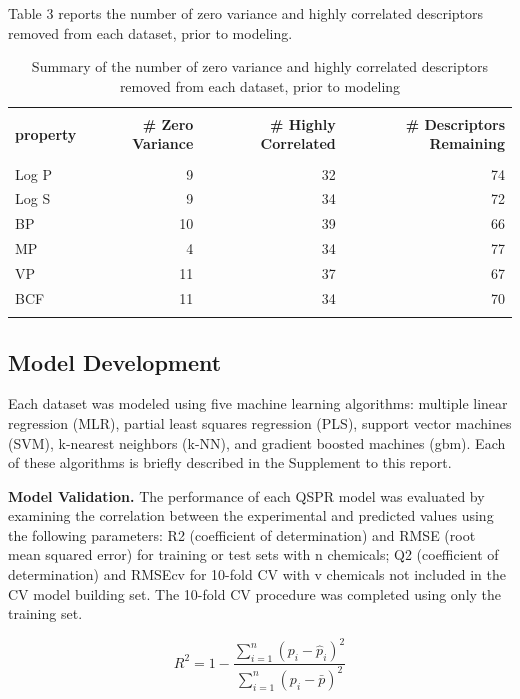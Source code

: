 \documentclass[10pt, letter]{article}
\renewcommand{\=}{\, =\, }
\newcommand{\+}{\, +\, }
\renewcommand{\-}{\, -\, }
\begin{document}
Table 3 reports the number of zero variance and highly correlated descriptors removed from each dataset, prior to modeling.

\begin{table}[H]
\begin{center}
\begin{tabular}{lrrr}
\toprule
&&\\
{\bf property} & {\bf  \# Zero Variance} & {\bf \# Highly Correlated} & {\bf \# Descriptors Remaining}\\
\midrule
&&\\
Log P  &  9 & 32 & 74\\
Log S  &  9 & 34 & 72\\
BP  &  10 & 39 & 66\\
MP  & 4 & 34 & 77\\
VP  & 11 & 37 & 67\\
BCF  & 11 & 34 & 70\\
&&\\
\bottomrule
\end{tabular}
\end{center}
\caption{Summary of the number of zero variance and highly correlated descriptors removed from each dataset, prior to modeling}
\end{table}

\subsection{Model Development}

Each dataset was modeled using five machine learning algorithms: multiple linear regression (MLR), partial least squares regression (PLS), support vector machines (SVM), k-nearest neighbors (k-NN), and gradient boosted machines (gbm). Each of these algorithms is briefly described in the Supplement to this report.

\textbf{Model Validation.} The performance of each QSPR model
was evaluated by examining the correlation between the
experimental and predicted values using the following
parameters: R2 (coefficient of determination) and RMSE
(root mean squared error) for training or test sets with n
chemicals; Q2 (coefficient of determination) and RMSEcv for
10-fold CV with v chemicals not included in the CV model
building set. The 10-fold CV procedure was completed using
only the training set.

\begin{equation}
R^{2} = 1 - \frac{\sum_{i = 1}^n(p_{i}-\hat{p}_{i})^{2}}{\sum_{i = 1}^n(p_{i}-\bar{p})^{2}}
\end{equation}
\end{document}
